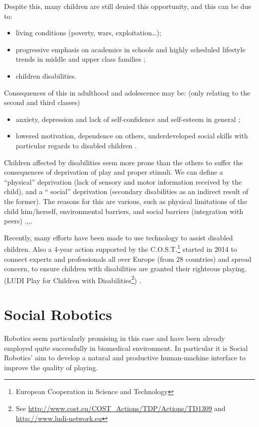 \documentclass[a4paper,twoside]{book}
\begin{document}
\beforelist* Despite this, many children are still denied this opportunity, and this can be due to:
\begin{itemize}
\item living conditions (poverty, wars, exploitation\ldots);
\item progressive emphasis on academics in schools and highly scheduled lifestyle trends in middle and upper class families \cite{art4};
\item children disabilities.
\end{itemize}
\afterlist*
\beforelist* Consequences of this in adulthood and adolescence may be: (only relating to the second and third classes)
\begin{itemize}
\item  anxiety, depression and lack of self-confidence and self-esteem in general \cite{art4};
\item lowered motivation, dependence on others, underdeveloped social skills with particular regards to disabled children \cite{art9}.
\end{itemize}
\afterlist*
Children affected by disabilities seem more prone than the others to suffer the consequences of deprivation of play and proper stimuli. We can define a  \textquotedblleft{}physical\textquotedblright{} deprivation (lack of sensory and motor information received by the child), and a \textquotedblleft
 social\textquotedblright{} deprivation (secondary disabilities as an indirect result of the former). The reasons for this are various, such as physical limitations of the child him/herself, environmental barriers, and social barriers (integration with peers) \cite{art2},\cite{art4},\cite{art8},\cite{art9}.

Recently, many efforts have been made to use technology to assist disabled children. Also a 4-year action supported by the C.O.S.T.\footnote{European Cooperation in Science and Technology} started in 2014 to connect experts and professionals all over Europe (from 28 countries) and spread concern, to ensure children with disabilities are granted their righteous playing. (LUDI \textemdash{} Play for Children with Disabilities\footnote{See \url{http://www.cost.eu/COST\_Actions/TDP/Actions/TD1309} and \url{http://www.ludi-network.eu}}) \cite{art3}.

\section{Social Robotics}
Robotics seem particularly promising in this case and have been already employed quite successfully in biomedical environment. In particular it is Social Robotics' aim to develop a natural and productive human-machine interface to improve the quality of playing.
 
\end{document}
